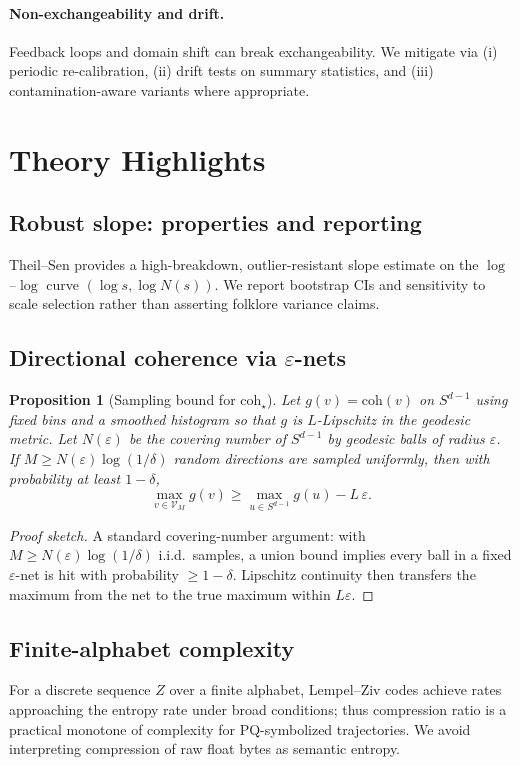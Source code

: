\documentclass[11pt]{article}
\newtheorem{proposition}{Proposition}
\begin{document}
\paragraph{Non-exchangeability and drift.} Feedback loops and domain shift can break exchangeability. We mitigate via (i) periodic re-calibration, (ii) drift tests on summary statistics, and (iii) contamination-aware variants where appropriate.

\section{Theory Highlights}
\subsection{Robust slope: properties and reporting}
Theil--Sen provides a high-breakdown, outlier-resistant slope estimate on the $\log$--$\log$ curve $(\log s,\log N(s))$. We report bootstrap CIs and sensitivity to scale selection rather than asserting folklore variance claims.

\subsection{Directional coherence via $\varepsilon$-nets}
\begin{proposition}[Sampling bound for $\mathrm{coh}_\star$]\label{prop:coh}
Let $g(v)=\mathrm{coh}(v)$ on $S^{d-1}$ using fixed bins and a smoothed histogram so that $g$ is $L$-Lipschitz in the geodesic metric. Let $N(\varepsilon)$ be the covering number of $S^{d-1}$ by geodesic balls of radius $\varepsilon$. If $M\ge N(\varepsilon)\log(1/\delta)$ random directions are sampled uniformly, then with probability at least $1-\delta$,
\[
\max_{v\in\mathcal{V}_M} g(v) \ge \max_{u\in S^{d-1}} g(u) - L\,\varepsilon.
\]
\end{proposition}
\begin{proof}[Proof sketch]
A standard covering-number argument: with $M\ge N(\varepsilon)\log(1/\delta)$ i.i.d.\ samples, a union bound implies every ball in a fixed $\varepsilon$-net is hit with probability $\ge 1-\delta$. Lipschitz continuity then transfers the maximum from the net to the true maximum within $L\varepsilon$.
\end{proof}

\subsection{Finite-alphabet complexity}
For a discrete sequence $Z$ over a finite alphabet, Lempel--Ziv codes achieve rates approaching the entropy rate under broad conditions; thus compression ratio is a practical monotone of complexity for PQ-symbolized trajectories. We avoid interpreting compression of raw float bytes as semantic entropy.
\end{document}
